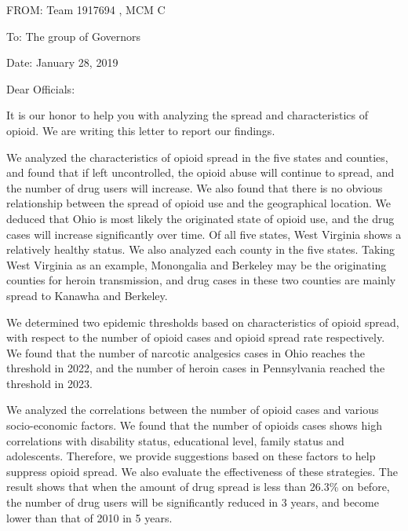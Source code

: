 \documentclass[13pt]{ctexart}
\begin{document}
\newpage
{}
\thispagestyle{empty}
\centering
\vspace{-8pt}
\justifying
{}

\noindent FROM: Team {} 1917694 , MCM C

\noindent To: The group of Governors

\noindent Date: January 28, 2019

\vspace{10pt}
\fontsize{13}{12.5}\selectfont
Dear Officials:

It is our honor to help you with analyzing the spread and characteristics of opioid. We are writing this letter to report our findings.

We analyzed the characteristics of opioid spread in the five states and counties, and found that if left uncontrolled, the opioid abuse will continue to spread, and the number of drug users will increase. We also found that there is no obvious relationship between the spread of opioid use and the geographical location. We deduced that Ohio is most likely the originated state of opioid use, and the drug cases will increase significantly over time. Of all five states, West Virginia shows a relatively healthy status. We also analyzed each county in the five states. Taking West Virginia as an example, Monongalia and Berkeley may be the originating counties for heroin transmission, and drug cases in these two counties are mainly spread to Kanawha and Berkeley.

We determined two epidemic thresholds based on characteristics of opioid spread, with respect to the number of opioid cases and opioid spread rate respectively. We found that the number of narcotic analgesics cases in Ohio reaches the threshold in 2022, and the number of heroin cases in Pennsylvania reached the threshold in 2023.

We analyzed the correlations between the number of opioid cases and various socio-economic factors. We found that the number of opioids cases shows high correlations with disability status, educational level, family status and adolescents. Therefore, we provide suggestions based on these factors to help suppress opioid spread. We also evaluate the effectiveness of these strategies. The result shows that when the amount of drug spread is less than 26.3\% on before, the number of drug users will be significantly reduced in 3 years, and become lower than that of 2010 in 5 years. 
\end{document}
